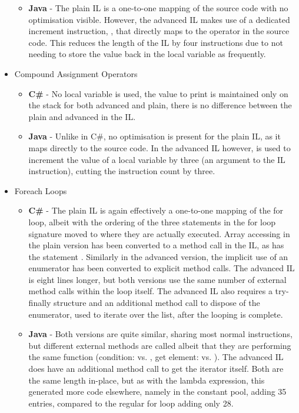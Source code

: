 \documentclass{article}
\begin{document}
\begin{itemize}
\begin{itemize}
                \item \textbf{Java} - The plain IL is a one-to-one mapping of the source code with no optimisation visible. However, the advanced IL makes use of a dedicated increment instruction, , that directly maps to the \codeword{++} operator in the source code. This reduces the length of the IL by four instructions due to not needing to store the value back in the local variable as frequently.
            \end{itemize}
            \item Compound Assignment Operators
            \begin{itemize}
                \item \textbf{C\#} - No local variable is used, the value to print is maintained only on the stack for both advanced and plain, there is no difference between the plain and advanced in the IL.
                \item \textbf{Java} - Unlike in C\#, no optimisation is present for the plain IL, as it maps directly to the source code. In the advanced IL however,  is used to increment the value of a local variable by three (an argument to the IL instruction), cutting the instruction count by three.
            \end{itemize}
            \item Foreach Loops
            \begin{itemize}
                \item \textbf{C\#} - The plain IL is again effectively a one-to-one mapping of the for loop, albeit with the ordering of the three statements in the for loop signature moved to where they are actually executed. Array accessing in the plain version has been converted to a method call in the IL, as has the statement . Similarly in the advanced version, the implicit use of an enumerator has been converted to explicit method calls. The advanced IL is eight lines longer, but both versions use the same number of external method calls within the loop itself. The advanced IL also requires a try-finally structure and an additional method call to dispose of the enumerator, used to iterate over the list, after the looping is complete.
                \item \textbf{Java} - Both versions are quite similar, sharing most normal instructions, but different external methods are called albeit that they are performing the same function (condition:  vs. , get element:  vs. ). The advanced IL does have an additional method call to get the iterator itself. Both are the same length in-place, but as with the lambda expression, this generated more code elsewhere, namely in the constant pool, adding 35 entries, compared to the regular for loop adding only 28.
            \end{itemize}
        \end{itemize}
\newpage
\end{document}
